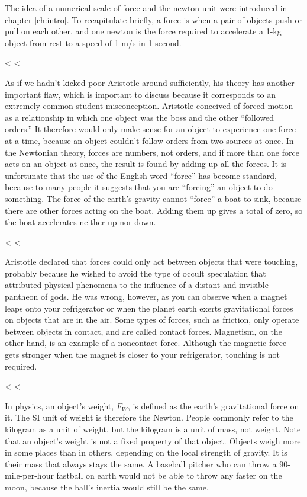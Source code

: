 The idea of a numerical scale of force and the newton unit
were introduced in chapter \ref{ch:intro}. To recapitulate briefly, a
force is when a pair of objects push or pull on each other,
and one newton is the force required to accelerate a 1-kg
object from rest to a speed of 1 m/s in 1 second.

<%
<%

As if we hadn't kicked poor Aristotle around sufficiently,
his theory has another important flaw, which is important to
discuss because it corresponds to an extremely common
student misconception. Aristotle conceived of forced motion
as a relationship in which one object was the boss and the
other ``followed orders.'' It therefore would only make
sense for an object to experience one force at a time,
because an object couldn't follow orders from two sources at
once. In the Newtonian theory, forces are numbers, not
orders, and if more than one force acts on an object at
once, the result is found by adding up all the forces. It is
unfortunate that the use of the English word ``force'' has
become standard, because to many people it suggests that you
are ``forcing'' an object to do something. The force of the
earth's gravity cannot ``force'' a boat to sink, because
there are other forces acting on the boat. Adding them up
gives a total of zero, so the boat accelerates neither up nor down.

<%
<%

Aristotle declared that forces could only act between
objects that were touching, probably because he wished to
avoid the type of occult speculation that attributed
physical phenomena to the influence of a distant and
invisible pantheon of gods. He was wrong, however, as you
can observe when a magnet leaps onto your refrigerator or
when the planet earth exerts gravitational forces on objects
that are in the air. Some types of forces, such as friction,
only operate between objects in contact, and are called
contact forces. Magnetism, on the
other hand, is an example of a noncontact
force. Although the magnetic force gets stronger when the
magnet is closer to your refrigerator, touching is not required.

<%
<%

In physics, an object's weight, $F_W$, is defined as the
earth's gravitational force on it. The SI unit of weight is
therefore the Newton. People commonly refer to the kilogram
as a unit of weight, but the kilogram is a unit of mass, not
weight. Note that an object's weight is not a fixed property
of that object. Objects weigh more in some places than in
others, depending on the local strength of gravity. It is
their mass that always stays the same. A baseball pitcher
who can throw a 90-mile-per-hour fastball on earth would not
be able to throw any faster on the moon, because the ball's
inertia would still be the same.

